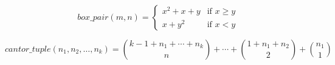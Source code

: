 \documentclass{article}
\begin{document}
\[
box\_pair(m, n) =
\begin{cases} 
  x^2+x+y &\mbox{if } x\ge y\\
  x+y^2   &\mbox{if } x < y
\end{cases}
\]

\[
cantor\_tuple(n_1,n_2,\ldots,n_k) =
  \binom{k-1+n_1+\cdots+n_k}{n}+\cdots+\binom{1+n_1+n_2}{2} + \binom{n_1}{1}
  \]
\end{document}

